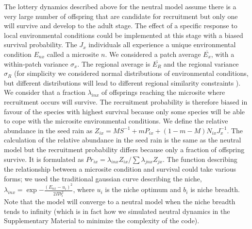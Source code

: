 \documentclass[12pt]{article}
\begin{document}
The lottery dynamics described above for the neutral model assume there is a
very large number of offspring that are candidate for recruitment but only one
will survive and develop to the adult stage. The effect of a specific response to
local environmental conditions could be implemented at this stage with a biased
survival probability. The $J_x$ individuals all experience a unique
environmental condition $E_{nx}$ called a microsite $n$. We considered a patch
average $\overline{E_x}$, with a within-patch variance $\sigma_x$. The regional
average is $\overline{E_R}$ and the regional variance $\sigma_R$ (for simplicity
we considered normal distributions of environmental conditions, but different
distributions will lead to different regional similarity constraints
\parencite{Mouquet2003,Tilman2004,Gravel2006}). We consider that a fraction
$\lambda_{inx}$ of offsprings reaching the microsite where recruitment occurs
will survive. The recruitment probability is therefore biased in favour of the
species with highest survival because only some species will be able to cope
with the microsite environmental conditions. We define the relative
abundance in the seed rain as $Z_{ix} = MS^{-1} + mP_{ix} +
(1-m-M)N_{ix}J_x^{-1}$. The calculation of the relative abundance in the seed
rain is the same as the neutral model but the recruitment probability differs
because only a fraction of offspring survive. It is formulated as $Pr_{ix} =
\lambda_{inx}Z_{ix}/\sum \lambda_{jnx}Z_{jx}$. The function describing
the relationship between a microsite condition and survival could take various
forms; we used the traditional gaussian curve describing the niche,
$\lambda_{inx} = \exp{-\frac{(E_{nx}-u_i)^2}{2\Pi b_i^2}}$, where $u_i$ is the
niche optimum and $b_i$ is niche breadth. Note that the model will converge to a
neutral model when the niche breadth tends to infinity (which is in fact how we
simulated neutral dynamics in the Supplementary Material to minimize the
complexity of the code).
\end{document}
